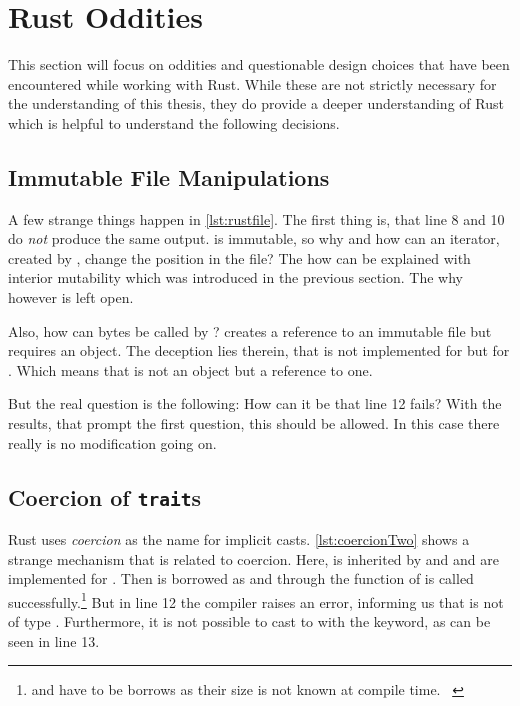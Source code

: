 \documentclass[thesis]{subfiles}
\begin{document}
\section{Rust Oddities}
  This section will focus on oddities and questionable design choices that have been encountered while working with Rust.
  While these are not strictly necessary for the understanding of this thesis, they do provide a deeper understanding of Rust which is helpful to understand the following decisions.

  \subsection{Immutable File Manipulations}
    A few strange things happen in \autoref{lst:rustfile}.
    The first thing is, that line 8 and 10 do \emph{not} produce the same output.
     is immutable, so why and how can an iterator, created by , change the position in the file?
    The how can be explained with interior mutability which was introduced in the previous section.
    The why however is left open.

    Also, how can bytes be called by ?
     creates a reference to an immutable file but  requires an object.
    The deception lies therein, that \trait \Read is not implemented for \File but for .
    Which means that \self is not an object but a reference to one.

    But the real question is the following: How can it be that line 12 fails?
    With the results, that prompt the first question, this should be allowed.
    In this case there really is no modification going on.


  \subsection{Coercion of \texttt{trait}s}
    Rust uses \emph{coercion} as the name for implicit casts.
    \autoref{lst:coercionTwo} shows a strange mechanism that is related to coercion.
    Here, \A is inherited by \B and \B and \A are implemented for \Foo.
    Then  is borrowed as  and through  the function \fun of \A is called successfully.\footnote{
       and  have to be borrows as their size is not known at compile time.%
      ~\autocite[E0277 referes to 19.4 Advanced Types]{rust-doc}
    }
    But in line 12 the compiler raises an error, informing us that  is not of type \A.
    Furthermore, it is not possible to cast  to  with the  keyword, as can be seen in line 13.
\end{document}
